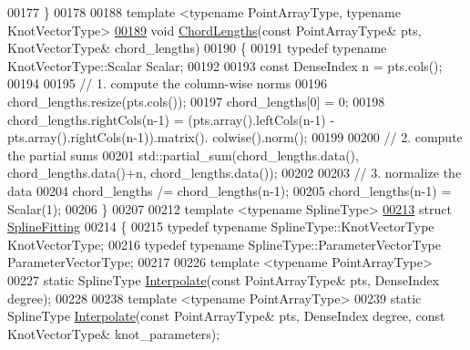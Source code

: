 \begin{DoxyCode}
00177   \}
00178 
00188   \textcolor{keyword}{template} <\textcolor{keyword}{typename} Po\textcolor{keywordtype}{int}ArrayType, \textcolor{keyword}{typename} KnotVectorType>
\hyperlink{group___splines___module_ga1b4cbde5d98411405871accf877552d2}{00189}   \textcolor{keywordtype}{void} \hyperlink{group___splines___module_ga1b4cbde5d98411405871accf877552d2}{ChordLengths}(\textcolor{keyword}{const} PointArrayType& pts, KnotVectorType& chord\_lengths)
00190   \{
00191     \textcolor{keyword}{typedef} \textcolor{keyword}{typename} KnotVectorType::Scalar Scalar;
00192 
00193     \textcolor{keyword}{const} DenseIndex n = pts.cols();
00194 
00195     \textcolor{comment}{// 1. compute the column-wise norms}
00196     chord\_lengths.resize(pts.cols());
00197     chord\_lengths[0] = 0;
00198     chord\_lengths.rightCols(n-1) = (pts.array().leftCols(n-1) - pts.array().rightCols(n-1)).matrix().
      colwise().norm();
00199 
00200     \textcolor{comment}{// 2. compute the partial sums}
00201     std::partial\_sum(chord\_lengths.data(), chord\_lengths.data()+n, chord\_lengths.data());
00202 
00203     \textcolor{comment}{// 3. normalize the data}
00204     chord\_lengths /= chord\_lengths(n-1);
00205     chord\_lengths(n-1) = Scalar(1);
00206   \}
00207 
00212   \textcolor{keyword}{template} <\textcolor{keyword}{typename} SplineType>
\hyperlink{group___splines___module}{00213}   \textcolor{keyword}{struct }\hyperlink{group___splines___module_struct_eigen_1_1_spline_fitting}{SplineFitting}
00214   \{
00215     \textcolor{keyword}{typedef} \textcolor{keyword}{typename} SplineType::KnotVectorType KnotVectorType;
00216     \textcolor{keyword}{typedef} \textcolor{keyword}{typename} SplineType::ParameterVectorType ParameterVectorType;
00217 
00226     \textcolor{keyword}{template} <\textcolor{keyword}{typename} Po\textcolor{keywordtype}{int}ArrayType>
00227     \textcolor{keyword}{static} SplineType \hyperlink{group___splines___module_adc80b6f0dd0dbbea28130fb254626874}{Interpolate}(\textcolor{keyword}{const} PointArrayType& pts, DenseIndex degree);
00228 
00238     \textcolor{keyword}{template} <\textcolor{keyword}{typename} Po\textcolor{keywordtype}{int}ArrayType>
00239     \textcolor{keyword}{static} SplineType \hyperlink{group___splines___module_adc80b6f0dd0dbbea28130fb254626874}{Interpolate}(\textcolor{keyword}{const} PointArrayType& pts, DenseIndex degree, \textcolor{keyword}{const} 
      KnotVectorType& knot\_parameters);

\end{DoxyCode}
